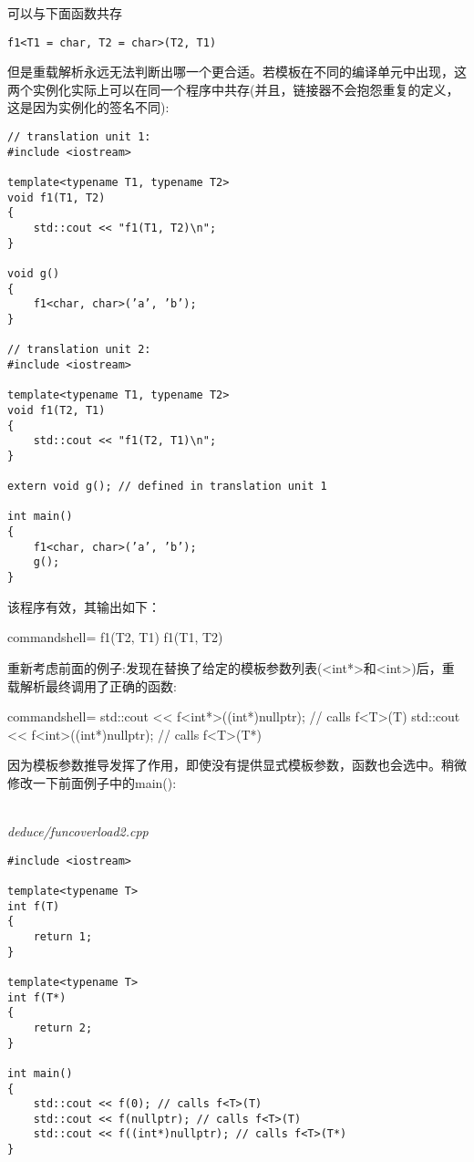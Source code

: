 可以与下面函数共存

\begin{lstlisting}[style=styleCXX]
f1<T1 = char, T2 = char>(T2, T1)
\end{lstlisting}

但是重载解析永远无法判断出哪一个更合适。若模板在不同的编译单元中出现，这两个实例化实际上可以在同一个程序中共存(并且，链接器不会抱怨重复的定义，这是因为实例化的签名不同):

\begin{lstlisting}[style=styleCXX]
// translation unit 1:
#include <iostream>

template<typename T1, typename T2>
void f1(T1, T2)
{
	std::cout << "f1(T1, T2)\n";
}

void g()
{
	f1<char, char>(’a’, ’b’);
}

// translation unit 2:
#include <iostream>

template<typename T1, typename T2>
void f1(T2, T1)
{
	std::cout << "f1(T2, T1)\n";
}

extern void g(); // defined in translation unit 1

int main()
{
	f1<char, char>(’a’, ’b’);
	g();
}
\end{lstlisting}

该程序有效，其输出如下：

\begin{tcblisting}{commandshell={}}
f1(T2, T1)
f1(T1, T2)
\end{tcblisting}


重新考虑前面的例子:发现在替换了给定的模板参数列表(<int*>和<int>)后，重载解析最终调用了正确的函数:

\begin{tcblisting}{commandshell={}}
std::cout << f<int*>((int*)nullptr); // calls f<T>(T)
std::cout << f<int>((int*)nullptr); // calls f<T>(T*)
\end{tcblisting}

因为模板参数推导发挥了作用，即使没有提供显式模板参数，函数也会选中。稍微修改一下前面例子中的main():

\hspace*{\fill} \\ %
\noindent
\textit{deduce/funcoverload2.cpp}
\begin{lstlisting}[style=styleCXX]
#include <iostream>

template<typename T>
int f(T)
{
	return 1;
}

template<typename T>
int f(T*)
{
	return 2;
}

int main()
{
	std::cout << f(0); // calls f<T>(T)
	std::cout << f(nullptr); // calls f<T>(T)
	std::cout << f((int*)nullptr); // calls f<T>(T*)
}
\end{lstlisting}

